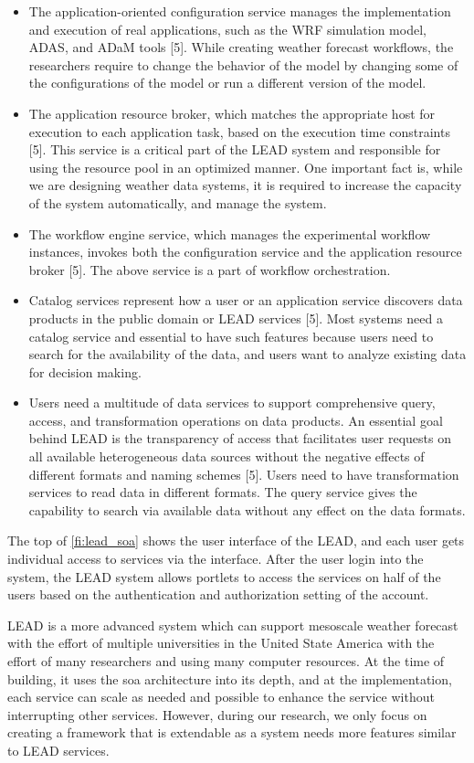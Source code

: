 \begin{itemize}
    \item The application-oriented configuration service manages the implementation and execution of real applications, such as the WRF simulation model, ADAS, and ADaM tools [5]. While creating weather forecast workflows, the researchers require to change the behavior of the model by changing some of the configurations of the model or run a different version of the model.
    \item The application resource broker, which matches the appropriate host for execution to each application task, based on the execution time constraints [5]. This service is a critical part of the LEAD system and responsible for using the resource pool in an optimized manner. One important fact is, while we are designing weather data systems, it is required to increase the capacity of the system automatically, and manage the system.
    \item The workflow engine service, which manages the experimental workflow instances, invokes both the configuration service and the application resource broker [5]. The above service is a part of workflow orchestration.
    \item Catalog services represent how a user or an application service discovers data products in the public domain or LEAD services [5]. Most systems need a catalog service and essential to have such features because users need to search for the availability of the data, and users want to analyze existing data for decision making.
    \item Users need a multitude of data services to support comprehensive query, access, and transformation operations on data products. An essential goal behind LEAD is the transparency of access that facilitates user requests on all available heterogeneous data sources without the negative effects of different formats and naming schemes [5]. Users need to have transformation services to read data in different formats. The query service gives the capability to search via available data without any effect on the data formats.
\end{itemize}

The top of \cref{fi:lead_soa} shows the user interface of the LEAD, and each user gets individual access to services via the interface. After the user login into the system, the LEAD system allows portlets to access the services on half of the users based on the authentication and authorization setting of the account.

LEAD is a more advanced system which can support mesoscale weather forecast with the effort of multiple universities in the United State America with the effort of many researchers and using many computer resources. At the time of  building, it uses the \acrshort{soa} architecture into its depth, and at the implementation, each service can scale as needed and possible to enhance the service without interrupting other services. However, during our research, we only focus on creating a framework that is extendable as a system needs more features similar to LEAD services.
